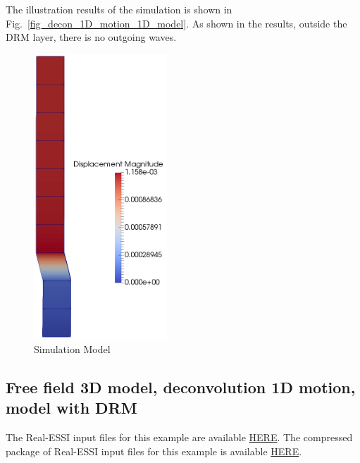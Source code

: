The illustration results of the simulation is shown in Fig.~\ref{fig_decon_1D_motion_1D_model}.
As shown in the results, outside the DRM layer, there is no outgoing waves. 

\begin{figure}[H]
  \centering
  \includegraphics[width = 5cm]{./Figure-files/Day2/Deconvolution_1D_Motions/Free_fields_1D_model_with_DRM/DRM1D_results.png}
  \caption{Simulation Model}
  \label{fig_decon_1D_motion_1D_model_results}
\end{figure}


\clearpage
\newpage
\subsection{Free field 3D model, deconvolution 1D motion, model with DRM}
\label{Free_fields_3D_model_with_DRM1}


The Real-ESSI input files for this example are available 
\href{https://github.com/yuan-energy/Real-ESSI-Short-Course-Examples/tree/master/short-course-examples/Day2/Deconvolution_1D_Motions/Free_fields_3D_model_with_DRM}{HERE}. 
The compressed package of Real-ESSI input files for this example is available 
\href{https://github.com/yuan-energy/Real-ESSI-Short-Course-Examples/blob/master/short-course-examples/Day2/Deconvolution_1D_Motions/Free_fields_3D_model_with_DRM/Free_fields_3D_model_with_DRM.tgz?raw=true}{HERE}. 

